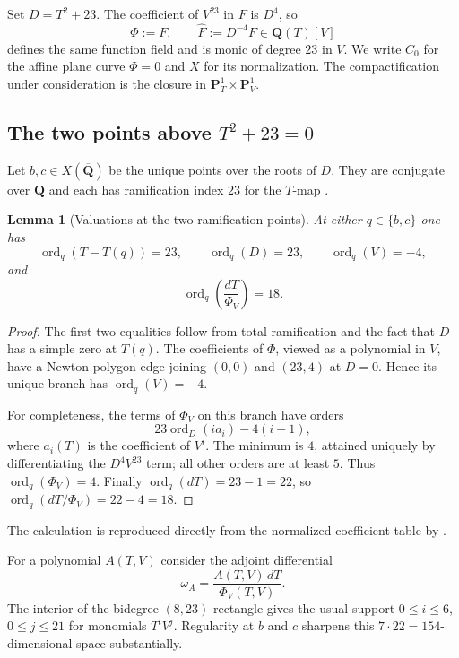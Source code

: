 \documentclass[11pt]{amsart}
\newtheorem{lemma}[lemma]{Lemma}
\theoremstyle{definition}
\theoremstyle{remark}
\newcommand{\QQ}{\mathbf Q}
\newcommand{\PP}{\mathbf P}
\newcommand{\ord}{\operatorname{ord}}
\begin{document}
Set $D=T^2+23$.  The coefficient of $V^{23}$ in $F$ is $D^4$, so
\[
 \Phi:=F,\qquad \widehat F:=D^{-4}F\in\QQ(T)[V]
\]
defines the same function field and is monic of degree $23$ in $V$.  We
write $C_0$ for the affine plane curve $\Phi=0$ and $X$ for its
normalization.  The compactification under consideration is the closure in
$\PP^1_T\times\PP^1_V$.

\subsection{The two points above \texorpdfstring{$T^2+23=0$}{T2+23=0}}

Let $b,c\in X(\overline{\QQ})$ be the unique points over the roots of $D$.
They are conjugate over $\QQ$ and each has ramification index $23$ for the
$T$-map \cite[Section~3]{HJLPPZ}.

\begin{lemma}[Valuations at the two ramification points]\label{lem:valuations}
At either $q\in\{b,c\}$ one has
\[
 \ord_q(T-T(q))=23,\qquad \ord_q(D)=23,
 \qquad \ord_q(V)=-4,
\]
and
\[
 \ord_q\!\left(\frac{dT}{\Phi_V}\right)=18.
\]
\end{lemma}

\begin{proof}
The first two equalities follow from total ramification and the fact that
$D$ has a simple zero at $T(q)$.  The coefficients of $\Phi$, viewed as a
polynomial in $V$, have a Newton-polygon edge joining $(0,0)$ and $(23,4)$ at
$D=0$.  Hence its unique branch has $\ord_q(V)=-4$.

For completeness, the terms of $\Phi_V$ on this branch have orders
\[
 23\ord_D(i a_i)-4(i-1),
\]
where $a_i(T)$ is the coefficient of $V^i$.  The minimum is $4$, attained
uniquely by differentiating the $D^4V^{23}$ term; all other orders are at
least $5$.  Thus $\ord_q(\Phi_V)=4$.  Finally
$\ord_q(dT)=23-1=22$, so $\ord_q(dT/\Phi_V)=22-4=18$.
\end{proof}

The calculation is reproduced directly from the normalized coefficient
table by .

For a polynomial $A(T,V)$ consider the adjoint differential
\[
 \omega_A=\frac{A(T,V)\,dT}{\Phi_V(T,V)}.
\]
The interior of the bidegree-$(8,23)$ rectangle gives the usual support
$0\leq i\leq6$, $0\leq j\leq21$ for monomials $T^iV^j$.  Regularity at
$b$ and $c$ sharpens this $7\cdot22=154$-dimensional space substantially.
\end{document}
